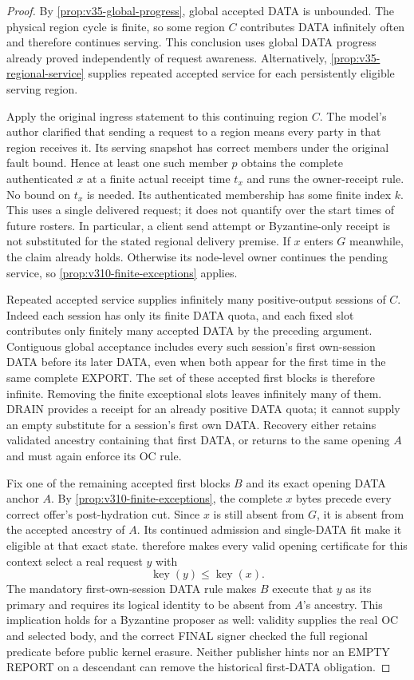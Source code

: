 \begin{proof}
By \cref{prop:v35-global-progress}, global accepted DATA is unbounded.
The physical region cycle is finite, so some region $C$ contributes
DATA infinitely often and therefore continues serving. This conclusion
uses global DATA progress already proved independently of request
awareness. Alternatively, \cref{prop:v35-regional-service} supplies
repeated accepted service for each persistently eligible serving region.

Apply the original ingress statement to this continuing region $C$.
The model's author clarified that sending a request to a region means
every party in that region receives it. Its serving snapshot has correct
members under the original fault bound. Hence at least one such member
$p$ obtains the complete authenticated $x$ at a finite actual receipt
time $t_x$ and runs the owner-receipt rule. No bound on $t_x$ is needed.
Its authenticated membership has some finite index
$k$. This uses a single delivered request; it does not quantify over the
start times of future rosters. In particular, a client send attempt or
Byzantine-only receipt is not substituted for the stated regional
delivery premise. If $x$ enters $G$ meanwhile, the claim
already holds. Otherwise its node-level owner continues the pending
service, so \cref{prop:v310-finite-exceptions} applies.

Repeated accepted service supplies infinitely many positive-output
sessions of $C$. Indeed each session has only its finite DATA quota,
and each fixed slot contributes only finitely many accepted DATA by
the preceding argument. Contiguous global acceptance includes every
such session's first own-session DATA before its later DATA, even when
both appear for the first time in the same complete EXPORT. The set of
these accepted first blocks is therefore infinite. Removing the finite
exceptional slots leaves infinitely many of them. DRAIN provides a
receipt for an already positive DATA quota; it cannot supply an empty
substitute for a session's first own DATA. Recovery either retains
validated ancestry containing that first DATA, or returns to the same
opening $A$ and must again enforce its OC rule.

Fix one of the remaining accepted first blocks $B$ and its exact
opening DATA anchor $A$. By \cref{prop:v310-finite-exceptions}, the
complete $x$ bytes precede every correct offer's post-hydration cut.
Since $x$ is still absent from $G$, it is absent from the accepted
ancestry of $A$. Its continued admission and single-DATA fit make it
eligible at that exact state.  therefore
makes every valid opening certificate for this context select a real
request $y$ with
\[
 \operatorname{key}(y)\le\operatorname{key}(x).
\]
The mandatory first-own-session DATA rule makes $B$ execute that $y$
as its primary and requires its logical identity to be absent from
$A$'s ancestry. This implication holds for a Byzantine proposer as
well: validity supplies the real OC and selected body, and the correct
FINAL signer checked the full regional predicate before public kernel
erasure. Neither publisher hints nor an EMPTY REPORT on a descendant
can remove the historical first-DATA obligation.


\end{proof}
